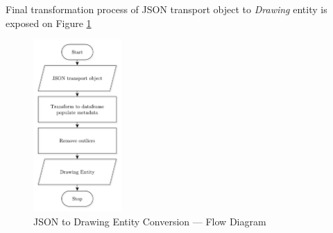 Final transformation process of JSON transport object to \textit{Drawing} entity is exposed on Figure \ref{alg-drawing}

\begin{figure}[htb]
  \centering
    \includegraphics[width=0.30\textwidth]
    {images/data-preprocessing/flow-json-conversion-vertical}
    \caption{JSON to Drawing Entity Conversion --- Flow Diagram}
    \label{alg-drawing}
\end{figure}